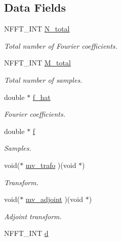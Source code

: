 \subsection*{Data Fields}
\begin{DoxyCompactItemize}
\item 
N\-F\-F\-T\-\_\-\-I\-N\-T \hyperlink{structnfct__plan_ad119bec761dbb42920ac1deafd68c8f2}{N\-\_\-total}
\begin{DoxyCompactList}\small\item\em Total number of Fourier coefficients. \end{DoxyCompactList}\item 
N\-F\-F\-T\-\_\-\-I\-N\-T \hyperlink{structnfct__plan_ae0dfb03dae08036e8fe9df5243580c4a}{M\-\_\-total}
\begin{DoxyCompactList}\small\item\em Total number of samples. \end{DoxyCompactList}\item 
double $\ast$ \hyperlink{structnfct__plan_af289164b09e85f75e8ed0eb3ded40d9c}{f\-\_\-hat}
\begin{DoxyCompactList}\small\item\em Fourier coefficients. \end{DoxyCompactList}\item 
double $\ast$ \hyperlink{structnfct__plan_acca00284f93bd33c00a1b099a6eec8cd}{f}
\begin{DoxyCompactList}\small\item\em Samples. \end{DoxyCompactList}\item 
void($\ast$ \hyperlink{structnfct__plan_a5f9802e95bfc2ae69f22e91c1fe47778}{mv\-\_\-trafo} )(void $\ast$)
\begin{DoxyCompactList}\small\item\em Transform. \end{DoxyCompactList}\item 
void($\ast$ \hyperlink{structnfct__plan_aab8ee071a4e254cbf94a03689ed3127f}{mv\-\_\-adjoint} )(void $\ast$)
\begin{DoxyCompactList}\small\item\em Adjoint transform. \end{DoxyCompactList}\item 
\hypertarget{structnfct__plan_a25e2220bb224e71387be8af5fc85157d}{N\-F\-F\-T\-\_\-\-I\-N\-T \hyperlink{structnfct__plan_a25e2220bb224e71387be8af5fc85157d}{d}}\label{structnfct__plan_a25e2220bb224e71387be8af5fc85157d}


\end{DoxyCompactItemize}
